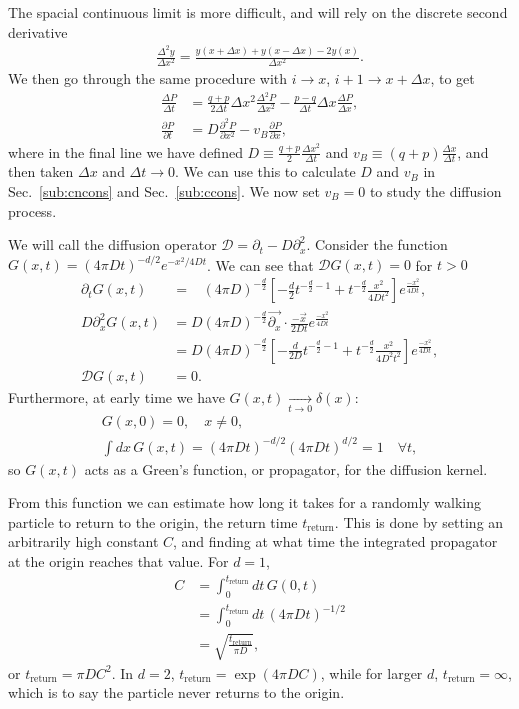 \documentclass[a4paper,11pt]{article}
\newcommand{\pd}[2]{\frac{\partial #1}{\partial #2}}
\newcommand{\pdn}[3]{\frac{\partial^{#3} #1}{\partial #2^{#3}}}
\newcommand{\ret}{\text{return}}
\newcommand{\nn}{\nonumber\\}
\begin{document}
The spacial continuous limit is more difficult, and will rely on the discrete second derivative
\begin{align}
\frac{\Delta^2y}{\Delta x^2} = \frac{y(x+\Delta x) + y(x-\Delta x) - 2 y(x)}{\Delta x^2}.
\end{align}
We then go through the same procedure with $i\to x$, $i+1\to x+\Delta x$, to get
\begin{align}
\frac{\Delta P}{\Delta t} &= \frac{q+p}{2\Delta t}\Delta x^2\frac{\Delta^2P}{\Delta x^2} - \frac{p-q}{\Delta t}\Delta x\frac{\Delta P}{\Delta x},\nn
\pd{P}{t}&= D\pdn{P}{x}{2}-v_B\pd{P}{x},
\end{align}
where in the final line we have defined $D\equiv\frac{q+p}{2}\frac{\Delta x^2}{\Delta t}$ and $v_B\equiv(q+p)\frac{\Delta x}{\Delta t}$, and then taken $\Delta x$ and $\Delta t\to 0$. We can use this to calculate $D$ and $v_B$ in Sec.~\ref{sub:cncons} and Sec.~\ref{sub:ccons}. We now set $v_B=0$ to study the diffusion process.

We will call the diffusion operator $\mathcal{D} = \partial_t-D\partial_x^2$. Consider the function $G(x,t)=(4\pi Dt)^{-d/2} e^{-x^2/4Dt}$. We can see that $\mathcal{D}G(x,t)=0$ for $t>0$ 
\begin{align}
\partial_t G(x,t) &= \phantom{D}(4\pi D)^{-\frac{d}{2}} \left[-\frac{d}{2} 
t^{-\frac{d}{2}-1} + t^{-\frac{d}{2}}\frac{x^2}{4Dt^2} \right]
e^{\frac{-x^2}{4Dt}},\\
D\partial_x^2 G(x,t) &= D(4\pi D)^{-\frac{d}{2}} \vec{\partial_x}\cdot 
\frac{-\vec{x}}{2Dt}e^{\frac{-x^2}{4Dt}} \nn
&= D(4\pi D)^{-\frac{d}{2}} \left[-\frac{d}{2D} 
t^{-\frac{d}{2}
	-1} + t^{-\frac{d}{2}}\frac{x^2}{4D^2t^2} \right]e^{\frac{-x^2}{4Dt}}, \\ 
\mathcal{D}G(x,t) &= 0.
\end{align}
Furthermore, at early time we have $G(x,t)\xrightarrow[t\to0]{}\delta(x)$:
\begin{align}
G(x,0) = 0, \quad x\ne 0,\\
\int dx\, G(x,t) = (4\pi Dt)^{-d/2}(4\pi Dt)^{d/2}=1\quad \forall t,
\end{align}
so $G(x,t)$ acts as a Green's function, or propagator, for the diffusion kernel.

From this function we can estimate how long it takes for a randomly walking particle to return to the origin, the return time $t_\ret$. This is done by setting an arbitrarily high constant $C$, and finding at what time the integrated propagator at the origin reaches that value. For $d=1$,
\begin{align}
C &= \int_{0}^{t_\ret}dt\,G(0,t)\\
&= \int_{0}^{t_\ret}dt\, (4\pi Dt)^{-1/2}\\
&= \sqrt{\frac{t_\ret}{\pi D}},
\end{align}
or $t_\ret=\pi D C^2$. In $d=2$, $t_\ret=\exp(4\pi DC)$, while for larger $d$, $t_\ret=\infty$, which is to say the particle never returns to the origin. 
\end{document}
